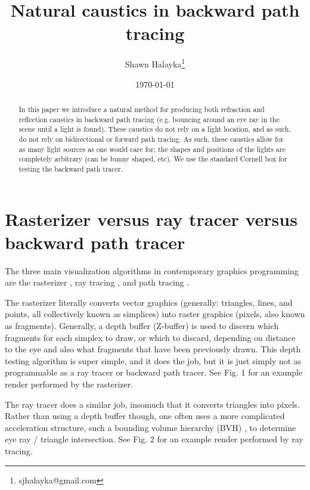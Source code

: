 \documentclass[12pt]{article}
\title{Natural caustics in backward path tracing}
\author{
Shawn Halayka\footnote{sjhalayka@gmail.com}
}
\date{\today\;\currenttime}
\begin{document}
\newcommand{\abs}[1]{\lvert#1\rvert}



\maketitle




\begin{abstract}
In this paper we introduce a natural method for producing both refraction and reflection caustics in backward path tracing (e.g. bouncing around an eye ray in the scene until a light is found).
These caustics do not rely on a light location, and as such, do not rely on bidirectional or forward path tracing.
As such, these caustics allow for as many light sources as one would care for; the shapes and positions of the lights are completely arbitrary (can be bunny shaped, etc).
We use the standard Cornell box for testing the backward path tracer.
\end{abstract}







\section{Rasterizer versus ray tracer versus backward path tracer}

The three main visualization algorithms in contemporary graphics programming are the rasterizer \cite{noll, wikipedia1}, ray tracing \cite{appel, wikipedia2}, and path tracing \cite{kajiya, wikipedia3}.

The rasterizer literally converts vector graphics (generally: triangles, lines, and points, all collectively known as simplices) into raster graphics (pixels, also known as fragments).
Generally, a depth buffer (Z-buffer) \cite{wikipedia4} is used to discern which fragments for each simplex to draw, or which to discard, depending on distance to the eye and also what fragments that have been previously drawn.
This depth testing algorithm is super simple, and it does the job, but it is just simply not as programmable as a ray tracer or backward path tracer.
See Fig. 1 for an example render performed by the rasterizer.


The ray tracer does a similar job, insomuch that it converts triangles into pixels.
Rather than using a depth buffer though, one often uses a more complicated acceleration structure, such a bounding volume hierarchy (BVH) \cite{wikipedia5}, to determine eye ray / triangle intersection.
See Fig. 2 for an example render performed by ray tracing.
\end{document}
